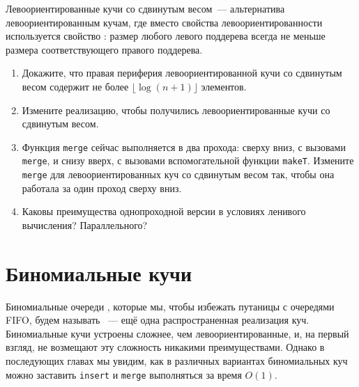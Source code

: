 \begin{frame}[fragile]{}
\begin{exercise}\label{ex:3.4}
  Левоориентированные кучи
  со сдвинутым весом~--- альтернатива левоориентированным кучам, где
  вместо свойства левоориентированности используется свойство
  : размер любого левого поддерева всегда не меньше размера
  соответствующего правого поддерева.
  \begin{enumerate}
    \item Докажите, что правая периферия левоориентированной кучи со
    сдвинутым весом содержит не более $\lfloor \log(n+1) \rfloor$ элементов.
    \item Измените реализацию, чтобы получились
    левоориентированные кучи со сдвинутым весом.
    \item Функция \lstinline!merge! сейчас выполняется в два прохода:
    сверху вниз, с вызовами \lstinline!merge!, и снизу вверх, с
    вызовами вспомогательной функции \lstinline!makeT!. Измените
    \lstinline!merge! для левоориентированных куч со сдвинутым весом
    так, чтобы она работала за один проход сверху вниз.
    \item Каковы преимущества однопроходной версии в
    условиях ленивого вычисления? Параллельного?
  \end{enumerate}
\end{exercise}

\end{frame}

\section{Биномиальные кучи}
\label{sc:3.2}

\begin{frame}[fragile]{}
Биномиальные очереди \cite{Vuillemin1978, Brown1978}, которые мы,
чтобы избежать путаницы с очередями FIFO, будем называть ~--- ещё одна распространенная реализация
куч. Биномиальные кучи устроены сложнее, чем левоориентированные, и, на
первый взгляд, не возмещают эту сложность никакими
преимуществами. Однако в последующих главах мы увидим, как в различных
вариантах биномиальных куч можно заставить \lstinline!insert! и
\lstinline!merge! выполняться за время $O(1)$.

\end{frame}

